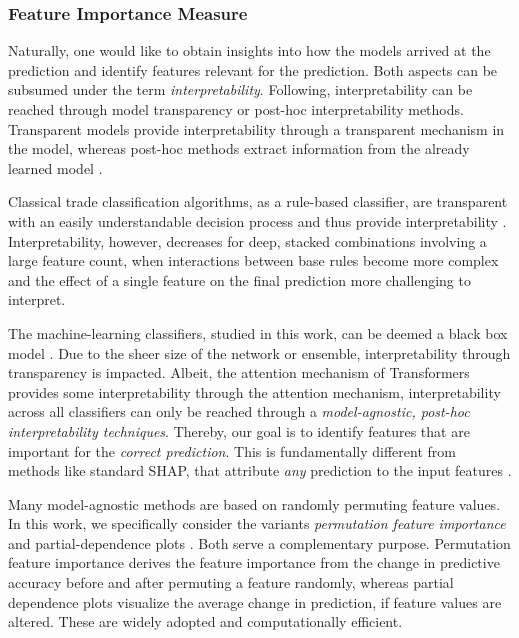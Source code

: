 \subsubsection{Feature Importance
    Measure}\label{sec:feature-importance-measure}

Naturally, one would like to obtain insights into how the models arrived at the prediction and identify features relevant for the prediction. Both aspects can be subsumed under the term \emph{interpretability}. Following, \textcite[][4]{liptonMythosModelInterpretability2017} interpretability can be reached through model transparency or post-hoc interpretability methods. Transparent models provide interpretability through a transparent mechanism in the model, whereas post-hoc methods extract information from the already learned model \autocite[][4--5]{liptonMythosModelInterpretability2017}.

Classical trade classification algorithms, as a rule-based classifier, are transparent with an easily understandable decision process and thus provide interpretability \autocite[][91]{barredoarrietaExplainableArtificialIntelligence2020}. Interpretability, however, decreases for deep, stacked combinations involving a large feature count, when interactions between base rules become more complex and the effect of a single feature on the final prediction more challenging to interpret.

The machine-learning classifiers, studied in this work, can be deemed a black box model \autocite[][90]{barredoarrietaExplainableArtificialIntelligence2020}. Due to the sheer size of the network or ensemble, interpretability through transparency is impacted. Albeit, the attention mechanism of Transformers provides some interpretability through the attention mechanism,  interpretability across all classifiers can only be reached through a \emph{model-agnostic, post-hoc interpretability techniques}. Thereby, our goal is to identify features that are important for the \emph{correct prediction}. This is fundamentally different from methods like standard \gls{SHAP}, that attribute \emph{any} prediction to the input features \autocite[][??]{chenTrueModelTrue2020}.

Many model-agnostic methods are based on randomly permuting feature values. In this work, we specifically consider the variants \emph{permutation feature importance} \autocite[][23--24]{breimanRandomForests2001} and partial-dependence plots \autocite[][26--28]{friedmanGreedyFunctionApproximation2001}. Both serve a complementary purpose. Permutation feature importance derives the feature importance from the change in predictive accuracy before and after permuting a feature randomly, whereas partial dependence plots visualize the average change in prediction, if feature values are altered. These are widely adopted and computationally efficient.

